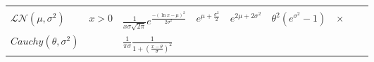 \documentclass[]{tufte-book}
\begin{document}
\begin{longtable}[]{@{}lllllllll@{}}
\begin{minipage}[t]{0.08\columnwidth}
\end{minipage} & \begin{minipage}[t]{0.08\columnwidth}\raggedright
\strut
\end{minipage} & \begin{minipage}[t]{0.08\columnwidth}\raggedright
\strut
\end{minipage}\tabularnewline
\begin{minipage}[t]{0.08\columnwidth}\raggedright
\(\mathcal{LN}(\mu,\sigma^2)\)\strut
\end{minipage} & \begin{minipage}[t]{0.08\columnwidth}\raggedright
\(x>0\)\strut
\end{minipage} & \begin{minipage}[t]{0.08\columnwidth}\raggedright
\(\frac{1}{x\sigma \sqrt{2\pi}}e^{\frac{-(\ln x-\mu)^2}{2\sigma^2}}\)\strut
\end{minipage} & \begin{minipage}[t]{0.08\columnwidth}\raggedright
\(e^{\mu+\frac{\sigma^2}2}\)\strut
\end{minipage} & \begin{minipage}[t]{0.08\columnwidth}\raggedright
\(e^{2\mu+2\sigma^2}\)\strut
\end{minipage} & \begin{minipage}[t]{0.08\columnwidth}\raggedright
\(\theta^2(e^{\sigma^2}-1)\)\strut
\end{minipage} & \begin{minipage}[t]{0.08\columnwidth}\raggedright
\(\times\)\strut
\end{minipage} & \begin{minipage}[t]{0.08\columnwidth}\raggedright
\strut
\end{minipage} & \begin{minipage}[t]{0.08\columnwidth}\raggedright
\strut
\end{minipage}\tabularnewline
\begin{minipage}[t]{0.08\columnwidth}\raggedright
\(Cauchy(\theta,\sigma^2)\)\strut
\end{minipage} & \begin{minipage}[t]{0.08\columnwidth}\raggedright
\strut
\end{minipage} & \begin{minipage}[t]{0.08\columnwidth}\raggedright
\(\frac{1}{\pi\sigma}\frac1{1+(\frac{x-\theta}{\sigma})^2}\)\strut
\end{minipage} & \begin{minipage}[t]{0.08\columnwidth}\raggedright

\end{minipage}
\end{longtable}
\end{document}
